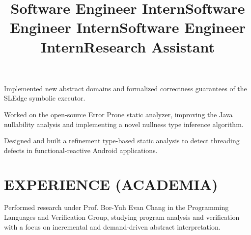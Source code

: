 \documentclass[margin,10pt]{res}
\begin{document}
\begin{resume}
\title{\textbf{Software Engineer Intern}}
\begin{position}
Implemented new abstract domains and formalized correctness guarantees of the SLEdge symbolic executor. \end{position}
\title{\textbf{Software Engineer Intern}}
\begin{position}
Worked on the open-source Error Prone static analyzer, improving the Java nullability analysis and implementing a novel nullness type inference algorithm.\end{position}
\title{\textbf{Software Engineer Intern}}
\begin{position}
Designed and built a refinement type-based static analysis to detect threading defects in functional-reactive Android applications.\end{position}


%

\section{EXPERIENCE (ACADEMIA)}
\title{\textbf{Research Assistant}}
\begin{position}
Performed research under Prof. Bor-Yuh Evan Chang in the Programming Languages and Verification Group, studying program analysis and verification with a focus on incremental and demand-driven abstract interpretation.
\end{position}


\end{resume}
\end{document}
